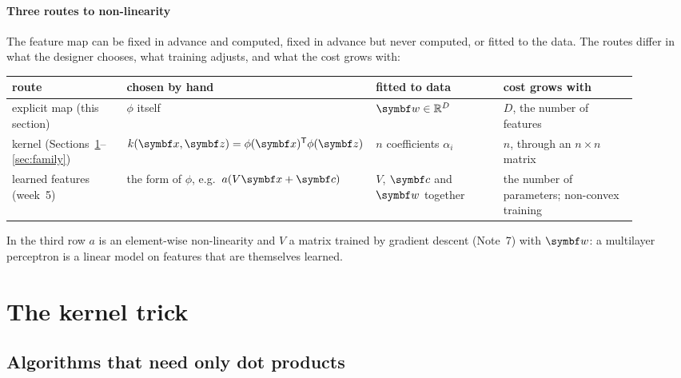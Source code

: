 \documentclass[11pt]{article}
\newcommand{\w}{\vect{w}}
\newcommand{\z}{\vect{z}}
\begin{document}
\paragraph{Three routes to non-linearity} The feature map can be fixed in advance and computed, fixed in advance but
never computed, or fitted to the data. The routes differ in what the designer chooses, what training adjusts, and
what the cost grows with:
\begin{center}\small
\begin{tabular}{@{}L{0.2\linewidth}L{0.25\linewidth}L{0.22\linewidth}L{0.24\linewidth}@{}}
\toprule
route & chosen by hand & fitted to data & cost grows with \\
\midrule
explicit map (this section) & $\phi$ itself & $\w \in \R^D$ & $D$, the number of features \\
kernel (Sections~\ref{sec:trick}--\ref{sec:family}) & $k(\x, \z) = \phi(\x)\T\phi(\z)$ & $n$ coefficients $\alpha_i$ & $n$, through an
$n \times n$ matrix \\
learned features (week~5) & the form of $\phi$, e.g.\ $a(V\x + \vect{c})$ & $V$, $\vect{c}$ and $\w$ together & the number of
parameters; non-convex training \\
\bottomrule
\end{tabular}
\end{center}
In the third row $a$ is an element-wise non-linearity and $V$ a matrix trained by gradient descent (Note~7) with $\w$: a
multilayer perceptron is a linear model on features that are themselves learned.

\section{The kernel trick}\label{sec:trick}

\subsection{Algorithms that need only dot products}
\end{document}

